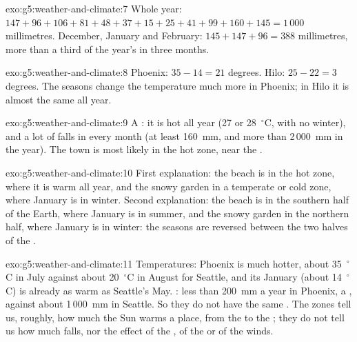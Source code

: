 \begin{solution}{exo:g5:weather-and-climate:7}
Whole year: $147 + 96 + 106 + 81 + 48 + 37 + 15 + 25 + 41 + 99 + 160 + 145
= 1\,000$ millimetres. December, January and February:
$145 + 147 + 96 = 388$ millimetres, more than a third of the year's  in
three months.
\end{solution}

\begin{solution}{exo:g5:weather-and-climate:8}
Phoenix: $35 - 14 = 21$ degrees. Hilo: $25 - 22 = 3$ degrees. The seasons
change the temperature much more in Phoenix; in Hilo it is almost the same
all year.
\end{solution}

\begin{solution}{exo:g5:weather-and-climate:9}
A  : it is hot all year (27 or 28~$^\circ$C, with no
winter), and a lot of  falls in every month (at least 160~mm, and more
than 2\,000~mm in the year). The town is most likely in the hot zone, near
the .
\end{solution}

\begin{solution}{exo:g5:weather-and-climate:10}
First explanation: the beach is in the hot zone, where it is warm all year,
and the snowy garden in a temperate or cold zone, where January is in
winter. Second explanation: the beach is in the southern half of the Earth,
where January is in summer, and the snowy garden in the northern half,
where January is in winter: the seasons are reversed between the two halves
of the .
\end{solution}

\begin{solution}{exo:g5:weather-and-climate:11}
Temperatures: Phoenix is much hotter, about 35~$^\circ$C in July against
about 20~$^\circ$C in August for Seattle, and its January (about
14~$^\circ$C) is already as warm as Seattle's May. : less than 200~mm a year
in Phoenix, a , against about 1\,000~mm in Seattle. So they do not
have the same . The zones tell us, roughly, how much the Sun warms
a place, from the  to the ; they do not tell us how much 
falls, nor the effect of the , of the  or of the winds.
\end{solution}
